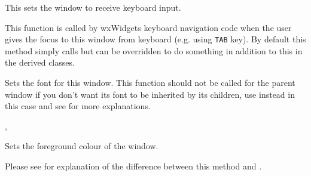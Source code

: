\label{wxwindowsetfocus}


This sets the window to receive keyboard input.




\label{wxwindowsetfocusfromkbd}


This function is called by wxWidgets keyboard navigation code when the user
gives the focus to this window from keyboard (e.g. using {\tt TAB} key).
By default this method simply calls  but
can be overridden to do something in addition to this in the derived classes.


\label{wxwindowsetfont}


Sets the font for this window. This function should not be called for the
parent window if you don't want its font to be inherited by its children,
use  instead in this case and
see  for more
explanations.




,\\


\label{wxwindowsetforegroundcolour}


Sets the foreground colour of the window.

Please see  for
explanation of the difference between this method and
.

